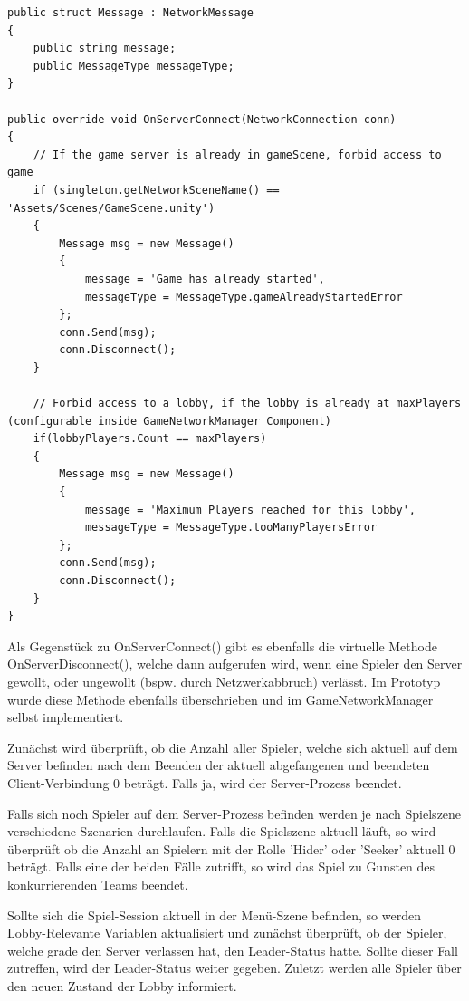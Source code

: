 \begin{lstlisting}[caption= GameNetworkManager.cs OnServerConnect() und Message struct]
public struct Message : NetworkMessage
{
	public string message;
	public MessageType messageType;
}
	
public override void OnServerConnect(NetworkConnection conn)
{
	// If the game server is already in gameScene, forbid access to game
	if (singleton.getNetworkSceneName() == 'Assets/Scenes/GameScene.unity')
	{
		Message msg = new Message()
		{
			message = 'Game has already started',
			messageType = MessageType.gameAlreadyStartedError
		};
		conn.Send(msg);
		conn.Disconnect();
	}
	
	// Forbid access to a lobby, if the lobby is already at maxPlayers (configurable inside GameNetworkManager Component)
	if(lobbyPlayers.Count == maxPlayers)
	{
		Message msg = new Message()
		{
			message = 'Maximum Players reached for this lobby',
			messageType = MessageType.tooManyPlayersError
		};
		conn.Send(msg);
		conn.Disconnect();
	}
}
\end{lstlisting}

Als Gegenstück zu OnServerConnect() gibt es ebenfalls die virtuelle Methode OnServerDisconnect(), welche dann aufgerufen wird, wenn eine Spieler den Server gewollt, oder ungewollt (bspw. durch Netzwerkabbruch) verlässt. Im Prototyp wurde diese Methode ebenfalls überschrieben und im GameNetworkManager selbst implementiert. 

Zunächst wird überprüft, ob die Anzahl aller Spieler, welche sich aktuell auf dem Server befinden nach dem Beenden der aktuell abgefangenen und beendeten Client-Verbindung 0 beträgt. Falls ja, wird der Server-Prozess beendet. 

Falls sich noch Spieler auf dem Server-Prozess befinden werden je nach Spielszene verschiedene Szenarien durchlaufen. Falls die Spielszene aktuell läuft, so wird überprüft ob die Anzahl an Spielern mit der Rolle 'Hider' oder 'Seeker' aktuell 0 beträgt. Falls eine der beiden Fälle zutrifft, so wird das Spiel zu Gunsten des konkurrierenden Teams beendet.

Sollte sich die Spiel-Session aktuell in der Menü-Szene befinden, so werden Lobby-Relevante Variablen aktualisiert und zunächst überprüft, ob der Spieler, welche grade den Server verlassen hat, den Leader-Status hatte. Sollte dieser Fall zutreffen, wird der Leader-Status weiter gegeben. Zuletzt werden alle Spieler über den neuen Zustand der Lobby informiert.


